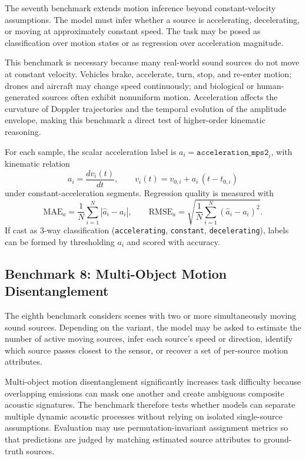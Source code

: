\documentclass{article}
\begin{document}
The seventh benchmark extends motion inference beyond constant-velocity assumptions. The model must infer whether a source is accelerating, decelerating, or moving at approximately constant speed. The task may be posed as classification over motion states or as regression over acceleration magnitude.

This benchmark is necessary because many real-world sound sources do not move at constant velocity. Vehicles brake, accelerate, turn, stop, and re-enter motion; drones and aircraft may change speed continuously; and biological or human-generated sources often exhibit nonuniform motion. Acceleration affects the curvature of Doppler trajectories and the temporal evolution of the amplitude envelope, making this benchmark a direct test of higher-order kinematic reasoning.

For each sample, the scalar acceleration label is \(a_i=\texttt{acceleration\_mps2}_i\), with kinematic relation
\begin{equation}
  a_i=\frac{dv_i(t)}{dt},
  \qquad
  v_i(t)=v_{0,i}+a_i\,(t-t_{0,i})
\end{equation}
under constant-acceleration segments. Regression quality is measured with
\begin{equation}
  \mathrm{MAE}_{a}=\frac{1}{N}\sum_{i=1}^{N}\left|\hat a_i-a_i\right|,
  \qquad
  \mathrm{RMSE}_{a}=\sqrt{\frac{1}{N}\sum_{i=1}^{N}\left(\hat a_i-a_i\right)^2}.
\end{equation}
If cast as 3-way classification (\texttt{accelerating}, \texttt{constant}, \texttt{decelerating}), labels can be formed by thresholding \(a_i\) and scored with accuracy.

\subsection{Benchmark 8: Multi-Object Motion Disentanglement}

The eighth benchmark considers scenes with two or more simultaneously moving sound sources. Depending on the variant, the model may be asked to estimate the number of active moving sources, infer each source's speed or direction, identify which source passes closest to the sensor, or recover a set of per-source motion attributes.

Multi-object motion disentanglement significantly increases task difficulty because overlapping emissions can mask one another and create ambiguous composite acoustic signatures. The benchmark therefore tests whether models can separate multiple dynamic acoustic processes without relying on isolated single-source assumptions. Evaluation may use permutation-invariant assignment metrics so that predictions are judged by matching estimated source attributes to ground-truth sources.
\end{document}
